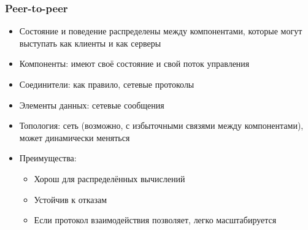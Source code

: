 \documentclass[xetex,mathserif,serif]{beamer}
\begin{document}
    \begin{frame}
        \frametitle{Peer-to-peer}
        \begin{itemize}
            \item Состояние и поведение распределены между компонентами, которые могут выступать как клиенты и как серверы
            \item Компоненты: имеют своё состояние и свой поток управления
            \item Соединители: как правило, сетевые протоколы
            \item Элементы данных: сетевые сообщения
            \item Топология: сеть (возможно, с избыточными связями между компонентами), может динамически меняться
            \item Преимущества:
            \begin{itemize}
                \item Хорош для распределённых вычислений
                \item Устойчив к отказам
                \item Если протокол взаимодействия позволяет, легко масштабируется
            \end{itemize}
        \end{itemize}
    \end{frame}
\end{document}
